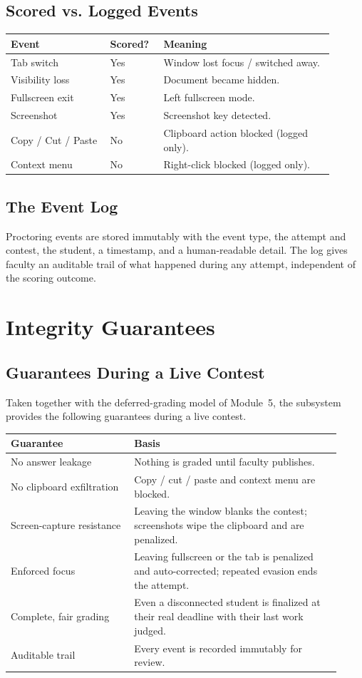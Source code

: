 \documentclass[12pt,a4paper,oneside]{report}
\begin{document}
\section{Scored vs. Logged Events}
\begin{longtable}{@{}p{0.28\linewidth} p{0.14\linewidth} p{0.48\linewidth}@{}}
\toprule
\textbf{Event} & \textbf{Scored?} & \textbf{Meaning}\\
\midrule
\endhead
Tab switch & Yes & Window lost focus / switched away.\\
Visibility loss & Yes & Document became hidden.\\
Fullscreen exit & Yes & Left fullscreen mode.\\
Screenshot & Yes & Screenshot key detected.\\
Copy / Cut / Paste & No & Clipboard action blocked (logged only).\\
Context menu & No & Right-click blocked (logged only).\\
\bottomrule
\end{longtable}

\section{The Event Log}
Proctoring events are stored immutably with the event type, the attempt and
contest, the student, a timestamp, and a human-readable detail. The log gives
faculty an auditable trail of what happened during any attempt, independent of
the scoring outcome.

\chapter{Integrity Guarantees}
\section{Guarantees During a Live Contest}
Taken together with the deferred-grading model of Module~5, the subsystem
provides the following guarantees during a live contest.
\begin{longtable}{@{}p{0.34\linewidth} p{0.58\linewidth}@{}}
\toprule
\textbf{Guarantee} & \textbf{Basis}\\
\midrule
\endhead
No answer leakage & Nothing is graded until faculty publishes.\\
No clipboard exfiltration & Copy / cut / paste and context menu are blocked.\\
Screen-capture resistance & Leaving the window blanks the contest; screenshots wipe the clipboard and are penalized.\\
Enforced focus & Leaving fullscreen or the tab is penalized and auto-corrected; repeated evasion ends the attempt.\\
Complete, fair grading & Even a disconnected student is finalized at their real deadline with their last work judged.\\
Auditable trail & Every event is recorded immutably for review.\\
\bottomrule
\end{longtable}
\end{document}
